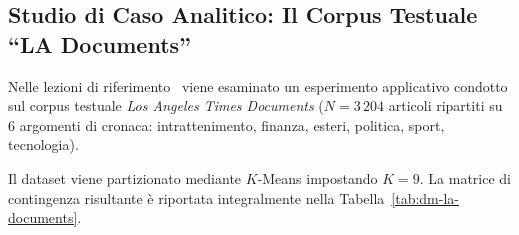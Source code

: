 \FloatBarrier
\subsection{Studio di Caso Analitico: Il Corpus Testuale ``LA Documents''}
Nelle lezioni di riferimento~\cite{tan2018} viene esaminato un esperimento applicativo condotto sul corpus testuale \textit{Los Angeles Times Documents} ($N = 3\,204$ articoli ripartiti su 6 argomenti di cronaca: intrattenimento, finanza, esteri, politica, sport, tecnologia).

Il dataset viene partizionato mediante $K$-Means impostando $K=9$. La matrice di contingenza risultante è riportata integralmente nella Tabella~\ref{tab:dm-la-documents}.

\begin{table}[H]
\centering
\small
\renewcommand{\arraystretch}{1.2}
\caption{Matrice di contingenza e calcolo di entropia e purezza per il clustering a $K=9$ del dataset \textit{LA Documents} (Tan et al.~\cite{tan2018}).}
\label{tab:dm-la-documents}
\end{table}

